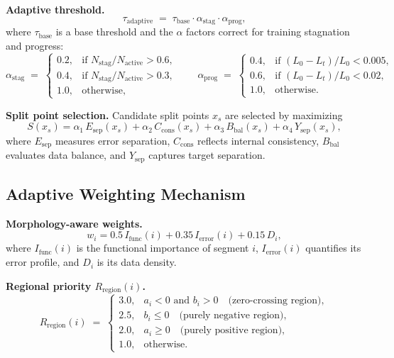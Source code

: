 \documentclass{article}
\theoremstyle{plain}
\theoremstyle{definition}
\theoremstyle{remark}
\begin{document}
\noindent\textbf{Adaptive threshold.}
\begin{equation}
\tau_{\mathrm{adaptive}}
\;=\; \tau_{\mathrm{base}} \cdot \alpha_{\mathrm{stag}} \cdot \alpha_{\mathrm{prog}},
\end{equation}
where $\tau_{\mathrm{base}}$ is a base threshold and the $\alpha$ factors correct for
training stagnation and progress:
\begin{equation}
\alpha_{\mathrm{stag}} \;=\;
\begin{cases}
0.2, & \text{if } N_{\mathrm{stag}}/N_{\mathrm{active}} > 0.6,\\
0.4, & \text{if } N_{\mathrm{stag}}/N_{\mathrm{active}} > 0.3,\\
1.0, & \text{otherwise,}
\end{cases}
\qquad
\alpha_{\mathrm{prog}} \;=\;
\begin{cases}
0.4, & \text{if } (L_0-L_t)/L_0 < 0.005,\\
0.6, & \text{if } (L_0-L_t)/L_0 < 0.02,\\
1.0, & \text{otherwise.}
\end{cases}
\end{equation}

\noindent\textbf{Split point selection.}
Candidate split points $x_s$ are selected by maximizing
\begin{equation}
S(x_s)
= \alpha_1\,E_{\mathrm{sep}}(x_s)
+ \alpha_2\,C_{\mathrm{cons}}(x_s)
+ \alpha_3\,B_{\mathrm{bal}}(x_s)
+ \alpha_4\,Y_{\mathrm{sep}}(x_s),
\end{equation}
where $E_{\mathrm{sep}}$ measures error separation, $C_{\mathrm{cons}}$ reflects
internal consistency, $B_{\mathrm{bal}}$ evaluates data balance, and $Y_{\mathrm{sep}}$
captures target separation.

\subsection{Adaptive Weighting Mechanism}

\noindent\textbf{Morphology-aware weights.}
\begin{equation}
w_i = 0.5\,I_{\mathrm{func}}(i) + 0.35\,I_{\mathrm{error}}(i) + 0.15\,D_i,
\end{equation}
where $I_{\mathrm{func}}(i)$ is the functional importance of segment $i$,
$I_{\mathrm{error}}(i)$ quantifies its error profile, and $D_i$ is its data density.

\noindent\textbf{Regional priority $R_{\mathrm{region}}(i)$.}
\begin{equation}
R_{\mathrm{region}}(i) \;=\;
\begin{cases}
3.0, & a_i < 0 \text{ and } b_i > 0 \quad \text{(zero-crossing region)},\\
2.5, & b_i \le 0 \quad \text{(purely negative region)},\\
2.0, & a_i \ge 0 \quad \text{(purely positive region)},\\
1.0, & \text{otherwise.}
\end{cases}
\end{equation}
\end{document}
